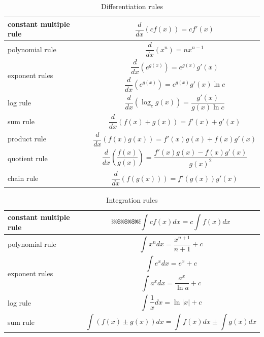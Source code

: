 \clearpage

 \begin{table}
 \caption{Differentiation rules}
\footnotesize
 \vspace{1em} 
 \begin{center}
 \begin{tabularx}{0.9\textwidth}{|l|X|}
 \hline
 constant multiple rule & \[\frac{d}{dx}\left(cf\left(x\right)\right) = cf'\left(x\right)\]\\\hline
polynomial rule &\[\frac{d}{dx}\left(x^n\right) = nx^{n-1}\]\\\hline
\multirow{2}{*}{exponent rules} & \[\frac{d}{dx}\left(e^{g(x)}\right) = e^{g(x)}g'(x)\]\\
 & \[\frac{d}{dx}\left(c^{g(x)}\right) = c^{g(x)}g'(x)\ln c\]\\\hline
 log rule & \[\frac{d}{dx}\left(\log_c g\left(x\right)\right) = \frac{g'(x)}{g(x)\ln c}\]\\\hline
 sum rule & \[\frac{d}{dx}\left(f\left(x\right) + g\left(x\right)\right) = f'(x) + g'(x)\]\\\hline
 product rule & \[\frac{d}{dx}\left(f\left(x\right)g\left(x\right)\right) = f'(x)g(x) + f(x)g'(x)\]\\\hline
 quotient rule & \[\frac{d}{dx}\left(\frac{f(x)}{g(x)}\right) = \frac{f'(x)g(x)-f(x)g'(x)}{g(x)^2}\]\\\hline
 chain rule & \[\frac{d}{dx}\left(f\left(g\left(x\right)\right)\right) = f'\left(g\left(x\right)\right)g'(x)\]\\\hline
 \end{tabularx}
 \end{center}
\end{table}
 \begin{table}
 \caption{Integration rules} 
\vspace{1em} \begin{center}
\footnotesize
 \begin{tabularx}{0.9\textwidth}{|l|X|}
 \hline
 constant multiple rule & \[￼￼￼￼\int cf\left(x\right) dx = c\int f(x) dx\]\\\hline
polynomial rule &\[\int x^n dx = \frac{x^{n+1}}{n+1} + c\]\\\hline
\multirow{2}{*}{exponent rules} & \[\int e^{x} dx = e^{x}+c\]\\
 & \[\int a^x dx = \frac{a^x}{\ln a} + c\]\\\hline
 log rule & \[\int \frac{1}{x} dx = \ln |x| + c\]\\\hline
 sum rule & \[\int\left(f(x)\pm g(x)\right) dx  = \int f(x) dx \pm \int g(x) dx\]\\\hline
 \end{tabularx}
 \end{center}
\end{table}


